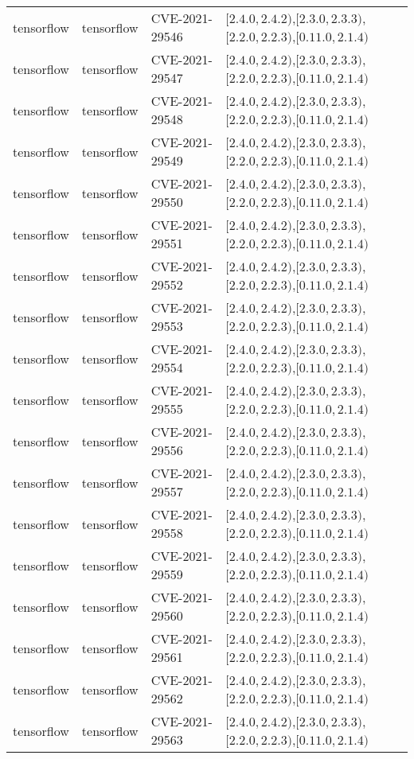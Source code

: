\begin{tabular}{llll}
tensorflow & tensorflow & CVE-2021-29546 & $[2.4.0,2.4.2)$,$[2.3.0,2.3.3)$,$[2.2.0,2.2.3)$,$[0.11.0,2.1.4)$ \\
tensorflow & tensorflow & CVE-2021-29547 & $[2.4.0,2.4.2)$,$[2.3.0,2.3.3)$,$[2.2.0,2.2.3)$,$[0.11.0,2.1.4)$ \\
tensorflow & tensorflow & CVE-2021-29548 & $[2.4.0,2.4.2)$,$[2.3.0,2.3.3)$,$[2.2.0,2.2.3)$,$[0.11.0,2.1.4)$ \\
tensorflow & tensorflow & CVE-2021-29549 & $[2.4.0,2.4.2)$,$[2.3.0,2.3.3)$,$[2.2.0,2.2.3)$,$[0.11.0,2.1.4)$ \\
tensorflow & tensorflow & CVE-2021-29550 & $[2.4.0,2.4.2)$,$[2.3.0,2.3.3)$,$[2.2.0,2.2.3)$,$[0.11.0,2.1.4)$ \\
tensorflow & tensorflow & CVE-2021-29551 & $[2.4.0,2.4.2)$,$[2.3.0,2.3.3)$,$[2.2.0,2.2.3)$,$[0.11.0,2.1.4)$ \\
tensorflow & tensorflow & CVE-2021-29552 & $[2.4.0,2.4.2)$,$[2.3.0,2.3.3)$,$[2.2.0,2.2.3)$,$[0.11.0,2.1.4)$ \\
tensorflow & tensorflow & CVE-2021-29553 & $[2.4.0,2.4.2)$,$[2.3.0,2.3.3)$,$[2.2.0,2.2.3)$,$[0.11.0,2.1.4)$ \\
tensorflow & tensorflow & CVE-2021-29554 & $[2.4.0,2.4.2)$,$[2.3.0,2.3.3)$,$[2.2.0,2.2.3)$,$[0.11.0,2.1.4)$ \\
tensorflow & tensorflow & CVE-2021-29555 & $[2.4.0,2.4.2)$,$[2.3.0,2.3.3)$,$[2.2.0,2.2.3)$,$[0.11.0,2.1.4)$ \\
tensorflow & tensorflow & CVE-2021-29556 & $[2.4.0,2.4.2)$,$[2.3.0,2.3.3)$,$[2.2.0,2.2.3)$,$[0.11.0,2.1.4)$ \\
tensorflow & tensorflow & CVE-2021-29557 & $[2.4.0,2.4.2)$,$[2.3.0,2.3.3)$,$[2.2.0,2.2.3)$,$[0.11.0,2.1.4)$ \\
tensorflow & tensorflow & CVE-2021-29558 & $[2.4.0,2.4.2)$,$[2.3.0,2.3.3)$,$[2.2.0,2.2.3)$,$[0.11.0,2.1.4)$ \\
tensorflow & tensorflow & CVE-2021-29559 & $[2.4.0,2.4.2)$,$[2.3.0,2.3.3)$,$[2.2.0,2.2.3)$,$[0.11.0,2.1.4)$ \\
tensorflow & tensorflow & CVE-2021-29560 & $[2.4.0,2.4.2)$,$[2.3.0,2.3.3)$,$[2.2.0,2.2.3)$,$[0.11.0,2.1.4)$ \\
tensorflow & tensorflow & CVE-2021-29561 & $[2.4.0,2.4.2)$,$[2.3.0,2.3.3)$,$[2.2.0,2.2.3)$,$[0.11.0,2.1.4)$ \\
tensorflow & tensorflow & CVE-2021-29562 & $[2.4.0,2.4.2)$,$[2.3.0,2.3.3)$,$[2.2.0,2.2.3)$,$[0.11.0,2.1.4)$ \\
tensorflow & tensorflow & CVE-2021-29563 & $[2.4.0,2.4.2)$,$[2.3.0,2.3.3)$,$[2.2.0,2.2.3)$,$[0.11.0,2.1.4)$ \\

\end{tabular}
